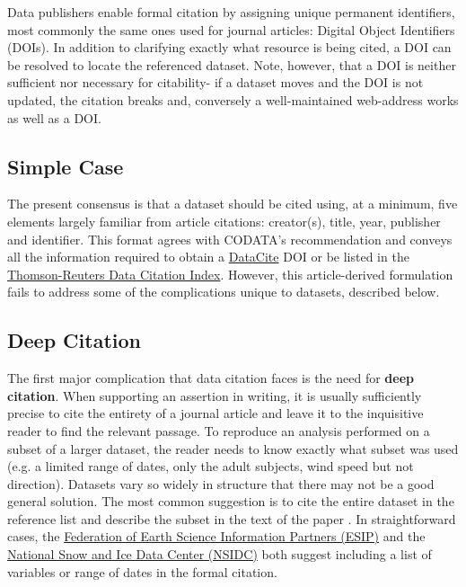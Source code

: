 \documentclass[10pt,twocolumn]{article}
\begin{document}
Data publishers enable formal citation by assigning unique permanent identifiers, most commonly the same ones used for journal articles: Digital Object Identifiers (DOIs).
In addition to clarifying exactly what resource is being cited, a DOI can be resolved to locate the referenced dataset.
Note, however, that a DOI is neither sufficient nor necessary for citability- if a dataset moves and the DOI is not updated, the citation breaks and, conversely a well-maintained web-address works as well as a DOI.


\subsection*{Simple Case}\label{simple-case}

The present consensus is that a dataset should be cited using, at a minimum, five elements largely familiar from article citations: creator(s), title, year, publisher and identifier.
This format agrees with CODATA's recommendation\cite{codata-icsti_task_group_on_data_citation_standards_and_practices_out_2013} and conveys all the information required to obtain a \href{http://www.datacite.org/}{DataCite} DOI\cite{datacite_datacite_2013} or be listed in the \href{http://thomsonreuters.com/data-citation-index/}{Thomson-Reuters Data Citation Index}.
However, this article-derived formulation fails to address some of the complications unique to datasets, described below.

\subsection*{Deep Citation}\label{deep-citation}

The first major complication that data citation faces is the need for \textbf{deep citation}.
When supporting an assertion in writing, it is usually sufficiently precise to cite the entirety of a journal article and leave it to the inquisitive reader to find the relevant passage.
To reproduce an analysis performed on a subset of a larger dataset, the reader needs to know exactly what subset was used (e.g. a limited range of dates, only the adult subjects, wind speed but not direction).
Datasets vary so widely in structure that there may not be a good general solution.
The most common suggestion is to cite the entire dataset in the reference list and describe the subset in the text of the paper \cite{altman_a_2007}.
In straightforward cases, the \href{http://wiki.esipfed.org/index.php/Interagency_Data_Stewardship/Citations/provider_guidelines#Subset_Used}{Federation of Earth Science Information Partners (ESIP)} and the \href{http://nsidc.org/about/use_copyright.html}{National Snow and Ice Data Center (NSIDC)} both suggest including a list of variables or range of dates in the formal citation.
\end{document}
